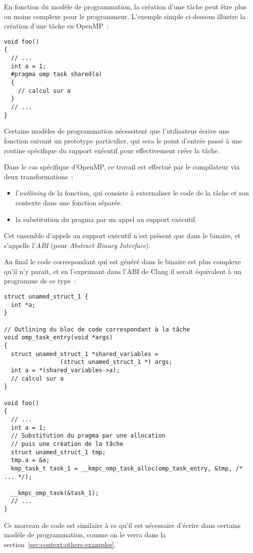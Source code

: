 En fonction du modèle de programmation, la création d'une tâche peut être plus ou moins complexe pour le programmeur.
L'exemple simple ci-dessous illustre la création d'une tâche en OpenMP~:
\begin{lstlisting}
void foo()
{
  // ...
  int a = 1;
  #pragma omp task shared(a)
  {
    // calcul sur a
  }
  // ...
}
\end{lstlisting}

Certains modèles de programmation nécessitent que l'utilisateur écrive une fonction suivant un prototype particulier, qui sera le point d'entrée passé à une routine spécifique du support exécutif pour effectivement créer la tâche.

Dans le cas spécifique d'OpenMP, ce travail est effectué par le compilateur via deux transformations~:
\begin{itemize}
  \item l'\emph{outlining} de la fonction, qui consiste à externaliser le code de la tâche et son contexte dans une fonction séparée.
  \item la substitution du pragma par un appel au support exécutif.
\end{itemize}

Cet ensemble d'appels au support exécutif n'est présent que dans le binaire, et s'appelle l'\emph{ABI} (pour \emph{Abstract Binary Interface}).

Au final le code correspondant qui est généré dans le binaire est plus complexe qu'il n'y parait, et en l'exprimant dans l'ABI de Clang il serait équivalent à un programme de ce type~:

\begin{lstlisting}
struct unamed_struct_1 {
  int *a;
}

// Outlining du bloc de code correspondant à la tâche
void omp_task_entry(void *args)
{
  struct unamed_struct_1 *shared_variables =
                (struct unamed_struct_1 *) args;
  int a = *(shared_variables->a);
  // calcul sur a
}

void foo()
{
  // ...
  int a = 1;
  // Substitution du pragma par une allocation
  // puis une création de la tâche
  struct unamed_struct_1 tmp;
  tmp.a = &a;
  kmp_task_t task_1 = __kmpc_omp_task_alloc(omp_task_entry, &tmp, /* ... */);

  __kmpc_omp_task(&task_1);
  // ...
}
\end{lstlisting}

Ce morceau de code est similaire à ce qu'il est nécessaire d'écrire dans certains modèle de programmation, comme on le verra dans la section~\ref{sec:context:others:examples}.


